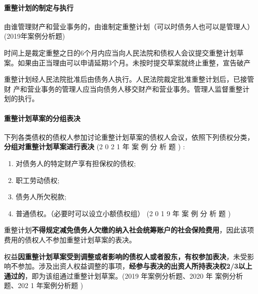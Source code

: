\documentclass[UTF8,12pt]{ctexart}
\numberwithin{equation}{section} %
\numberwithin{figure}{section}
\numberwithin{table}{section}
\begin{document}
	\paragraph{重整计划的制定与执行}
	由谁管理财产和营业事务的，由谁制定重整计划（可以时债务人也可以是管理人）(2019年案例分析题)
	
	时间上是裁定重整之日的6个月内应当向人民法院和债权人会议提交重整计划草案。如果由正当理由可以申请延期3个月。未按时提交草案就终止重整，宣告破产
	
	重整计划经人民法院批准后由债务人执行。人民法院裁定批准重整计划后，已接管财 产和营业事务的管理人应当向债务人移交财产和营业事务。管理人监督重整计划的执行。
	
	
	\paragraph{重整计划草案的分组表决}
	
	下列各类债权的债权人参加讨论重整计划草案的债权人会议，依照下列债权分类，\textbf{分组对重整计划草案进行表决} (2 0 2 1 年 案 例 分 析 题 ) :
	\begin{enumerate}
		\item 对债务人的特定财产享有担保权的债权;
		
		\item 职工劳动债权;
		
		\item 债务人所欠税款;
		
		\item 普通债权。（必要时可以设立小额债权组） (2 0 1 9 年 案 例 分 析 题 )
	\end{enumerate}
	重整计划\textbf{不得规定减免债务人欠缴的纳入社会统筹账户的社会保险费用}，因此该项费用的债权人不参加重整计划草案的表决。
	
	权益\textbf{因重整计划草案受到调整或者影响的债权人或者股东，有权参加表决}，未受影响不参加。涉及出资人权益调整的事项，\textbf{经参与表决的出资人所持表决权2/3以上通过的}，即为该组通过重整计划草案。(2019 年案例分析题、2020 年 案例分析题、202 1 年案例分析题 )
	
\end{document}
